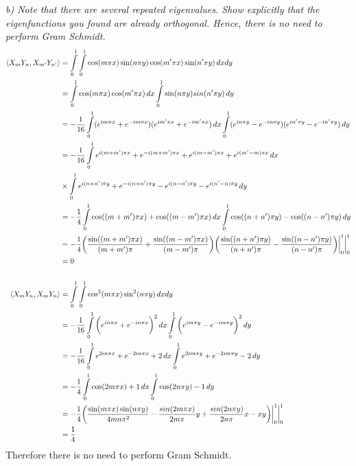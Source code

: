 \documentclass[12pt]{article}
\theoremstyle{remark}
\begin{document}
\textit{b) Note that there are several repeated eigenvalues. Show explicitly that the eigenfunctions you found are already orthogonal. Hence, there is no need to perform Gram Schmidt.} \\ 

\begin{align*}
\braket{X_mY_n, X_{m^\prime}Y_{n^\prime}} & = \int\limits_0^1\int\limits_0^1 \cos(m\pi x)\sin(n\pi y)\cos(m^\prime \pi x)\sin(n^\prime \pi y) \, dxdy
\\ & = \int\limits_0^1 \cos(m\pi x)\cos(m^\prime\pi x) \, dx \int\limits_0^1 \sin(n\pi y)sin(n^\prime\pi y) \, dy 
\\ & = -\frac{1}{16}\int\limits_0^1 (e^{im\pi x} + e^{-im\pi x})( e^{im^\prime\pi  x} + e^{-im^\prime\pi  x}) \, dx \int\limits_0^1 (e^{in\pi y} - e^{-in\pi y})( e^{in^\prime\pi  y} - e^{-in^\prime\pi  y}) \, dy 
\\ & = -\frac{1}{16}\int\limits_0^1 e^{i(m+m^\prime)\pi  x} + e^{-i(m+m^\prime)\pi  x} + e^{i(m-m^\prime)\pi x} + e^{i(m^\prime-m)\pi x} \, dx 
\\ & \times \int\limits_0^1 e^{i(n+n^\prime)\pi y} + e^{-i(n+n^\prime)\pi y} - e^{i(n-n^\prime)\pi y} - e^{i(n^\prime-n)\pi y} \, dy 
\\ & = -\frac{1}{4}\int\limits_0^1 \cos((m+m^\prime)\pi x) + \cos((m-m^\prime)\pi x) \, dx \int\limits_0^1 \cos((n+n^\prime)\pi y) - \cos((n-n^\prime)\pi y) \, dy
\\ & = -\frac{1}{4}\bigg(\frac{\sin((m+m^\prime)\pi x)}{(m+m^\prime)\pi} + \frac{\sin((m-m^\prime)\pi x)}{(m-m^\prime)\pi}\bigg)\bigg(\frac{\sin((n+n^\prime)\pi y)}{(n+n^\prime)\pi} - \frac{\sin((n-n^\prime)\pi y)}{(n-n^\prime)\pi}\bigg)\bigg\vert_0^1\bigg\vert_0^1
\\ & = 0
\\
\\ \braket{X_mY_n,X_mY_n} & = \int\limits_0^1\int\limits_0^1 \cos^2(m\pi x)\sin^2(n\pi y) \, dxdy
\\ & = -\frac{1}{16}\int\limits_0^1 \bigg(e^{in\pi x} + e^{-in\pi x}\bigg)^2 \, dx\int\limits_0^1 \bigg(e^{im\pi y} - e^{-im\pi y}\bigg)^2 \, dy
\\ & = -\frac{1}{16}\int\limits_0^1 e^{2in\pi x} + e^{-2in\pi x} + 2 \, dx \int\limits_0^1 e^{2im\pi y} + e^{-2im\pi y} - 2 \, dy 
\\ & = -\frac{1}{4}\int\limits_0^1 \cos(2m\pi x) + 1 \, dx\int\limits_0^1 \cos(2n\pi y) - 1 \, dy
\\ & = -\frac{1}{4}\bigg(\frac{\sin(m\pi x)\sin(n\pi y)}{4mn\pi^2} - \frac{sin(2m\pi x)}{2m\pi}y + \frac{sin(2n\pi y)}{2n\pi}x - xy  \bigg)\bigg\vert_0^1\bigg\vert_0^1
\\ & = \frac{1}{4}
\end{align*}
Therefore there is no need to perform Gram Schmidt.
\end{document}
